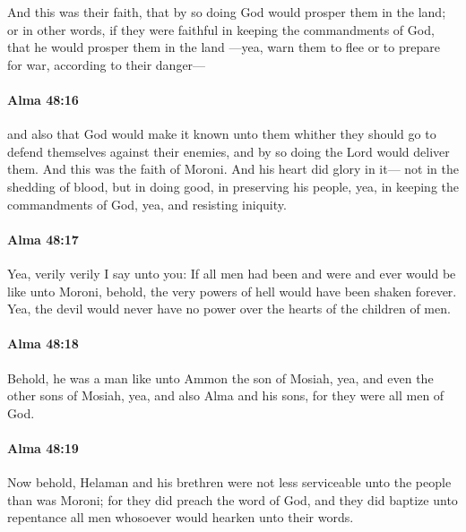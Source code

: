 			And this was their faith,
			that by so doing God would prosper them in the land;
			or in other words, if they were faithful in keeping the commandments of God,
			that he would prosper them in the land
			---yea, warn them to flee or to prepare for war, according to their danger---

		\paragraph{Alma 48:16} %
			\label{ALMA-48-16}

			and also that God would make it known unto them
			whither they should go to defend themselves against their enemies,
			and by so doing the Lord would deliver them.
			And this was the faith of Moroni.
			And his heart did glory in it---
			not in the shedding of blood,
			but in doing good, in preserving his people,
			yea, in keeping the commandments of God,
			yea, and resisting iniquity.

		\paragraph{Alma 48:17} %
			\label{ALMA-48-17}

			Yea, verily verily I say unto you:
			If all men had been and were and ever would be like unto Moroni,
			behold, the very powers of hell would have been shaken forever.
			Yea, the devil would never have no power over the hearts of the children of men.

		\paragraph{Alma 48:18} %
			\label{ALMA-48-18}

			Behold, he was a man like unto Ammon the son of Mosiah,
			yea, and even the other sons of Mosiah,
			yea, and also Alma and his sons,
			for they were all men of God.

		\paragraph{Alma 48:19} %
			\label{ALMA-48-19}

			Now behold, Helaman and his brethren
			were not less serviceable unto the people than was Moroni;
			for they did preach the word of God,
			and they did baptize unto repentance all men
			whosoever would hearken unto their words.


